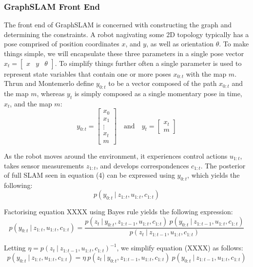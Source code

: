 \documentclass[a4paper]{article}
\begin{document}
\subsubsection{GraphSLAM Front End}
The front end of GraphSLAM is concerned with constructing the graph and determining the constraints. A robot nagivating some 2D topology typically has a pose comprised of position coordinates $x$, and $y$, as well as orientation $\theta$. To make things simple, we will encapsulate these three parameters in a single pose vector $x_t = \begin{bmatrix} x & y & \theta \end{bmatrix}$. To simplify things further often a single parameter is used to represent state variables that contain one or more poses $x_{0:t}$ with the map $m$. Thrun and Montemerlo define $y_{0:t}$ to be a vector composed of the path $x_{0:t}$ and the map $m$, whereas $y_t$ is simply composed as a single momentary pose in time, $x_t$, and the map $m$:
\begin{equation}
y_{0:t} =
\begin{bmatrix}
x_0 \\ x_1 \\ \vdots \\ x_t \\ m
\end{bmatrix}
\quad\mathrm{and}\quad 
y_t =
\begin{bmatrix}
x_t \\ m
\end{bmatrix}
\end{equation}

As the robot moves around the environment, it experiences control actions $u_{1:t}$, takes sensor measurements $z_{1:t}$, and develops correspondences $c_{1:t}$. The posterior of full SLAM seen in equation (4) can be expressed using $y_{0:t}$, which yields the following:
\begin{equation}
p(y_{0:t} \ | \ z_{1:t}, u_{1:t}, c_{1:t})
\end{equation}

Factorising equation XXXX using Bayes rule yields the following expression:
\begin{equation}
p(y_{0:t} \ | \ z_{1:t}, u_{1:t}, c_{1:t}) = \frac{p(z_t \ | \ y_{0:t}, z_{1:t-1}, u_{1:t}, c_{1:t}) \ p(y_{0:t} \ | \ z_{1:t-1}, u_{1:t}, c_{1:t})}{p(z_t \ | \ z_{1:t-1}, u_{1:t}, c_{1:t})}
\end{equation}

Letting $\eta = p(z_t \ | \ z_{1:t-1}, u_{1:t}, c_{1:t})^{-1}$, we simplify equation (XXXX) as follows:
\begin{equation}
p(y_{0:t} \ | \ z_{1:t}, u_{1:t}, c_{1:t}) = \eta \ p(z_t \ | \ y_{0:t}, z_{1:t-1}, u_{1:t}, c_{1:t}) \ p(y_{0:t} \ | \ z_{1:t-1}, u_{1:t}, c_{1:t})
\end{equation}
\end{document}
